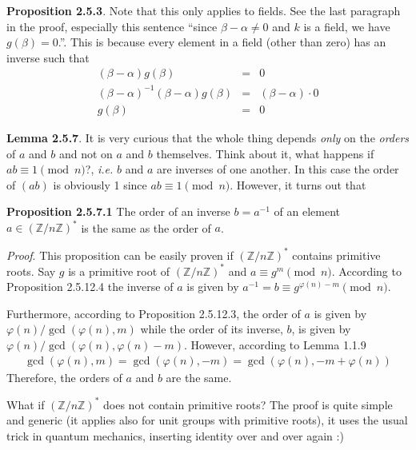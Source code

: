 \documentclass[aps,preprint,preprintnumbers,nofootinbib,showpacs,prd]{revtex4-1}
\newcommand{\ie}{{\it i.e.} }
\newcommand{\nbea}{\begin{eqnarray*}}
\newcommand{\neea}{\end{eqnarray*}}
\begin{document}
{\bf Proposition 2.5.3}. Note that this only applies to fields. See the last paragraph in the proof, especially this sentence ``since $\beta-\alpha \neq 0$ and $k$ is a field, we have $g(\beta)=0$.''. This is because every element in a field (other than zero) has an inverse such that
%
\nbea
(\beta - \alpha)g(\beta) & = & 0 \\
(\beta - \alpha)^{-1}(\beta - \alpha)g(\beta) & = & (\beta - \alpha) \cdot 0 \\
g(\beta) & = & 0
\neea
%

{\bf Lemma 2.5.7}. It is very curious that the whole thing depends {\it only} on the {\it orders} of $a$ and $b$ and not on $a$ and $b$ themselves. Think about it, what happens if $ab \equiv 1 \pmod{n}$?, \ie $b$ and $a$ are inverses of one another. In this case the order of $(ab)$ is obviously 1 since $ab \equiv 1 \pmod{n}$. However, it turns out that

{\bf Proposition 2.5.7.1} The order of an inverse $b = a^{-1}$ of an element $a \in (\mathbb{Z}/n\mathbb{Z})^*$ is the same as the order of $a$.

{\it Proof}. This proposition can be easily proven if $(\mathbb{Z}/n\mathbb{Z})^*$ contains primitive roots. Say $g$ is a primitive root of $(\mathbb{Z}/n\mathbb{Z})^*$ and $a \equiv g^m \pmod{n}$. According to Proposition 2.5.12.4 the inverse of $a$ is given by $a^{-1} = b \equiv g^{\varphi(n) - m} \pmod{n}$.

Furthermore, according to Proposition 2.5.12.3, the order of $a$ is given by $\varphi(n)/\gcd(\varphi(n), m)$ while the order of its inverse, $b$, is given by $\varphi(n)/\gcd(\varphi(n), \varphi(n) - m)$. However, according to Lemma 1.1.9
%
\nbea
\gcd(\varphi(n), m)  = \gcd(\varphi(n), -m) = \gcd(\varphi(n), - m + \varphi(n))
\neea
%
Therefore, the orders of $a$ and $b$ are the same.

What if $(\mathbb{Z}/n\mathbb{Z})^*$ does not contain primitive roots? The proof is quite simple and generic (it applies also for unit groups with primitive roots), it uses the usual trick in quantum mechanics, inserting identity over and over again :)
\end{document}
